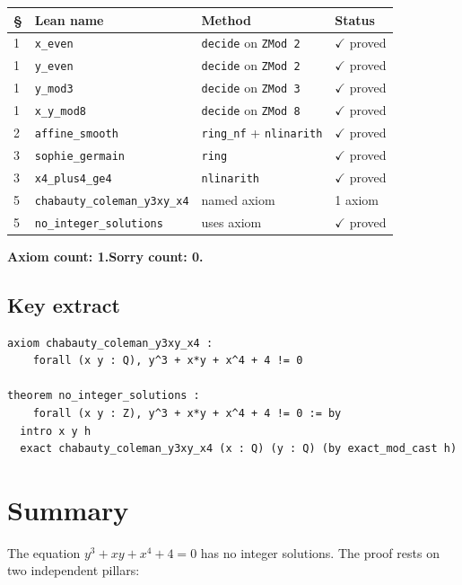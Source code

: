 \documentclass[12pt, a4paper]{article}
\theoremstyle{definition}
\begin{document}
\begin{center}
\begin{tabular}{llll}
\toprule
\S & Lean name & Method & Status \\
\midrule
1 & \texttt{x\_even} & \texttt{decide} on \texttt{ZMod 2} & $\checkmark$ proved \\
1 & \texttt{y\_even} & \texttt{decide} on \texttt{ZMod 2} & $\checkmark$ proved \\
1 & \texttt{y\_mod3} & \texttt{decide} on \texttt{ZMod 3} & $\checkmark$ proved \\
1 & \texttt{x\_y\_mod8} & \texttt{decide} on \texttt{ZMod 8} & $\checkmark$ proved \\
2 & \texttt{affine\_smooth} & \texttt{ring\_nf} + \texttt{nlinarith} & $\checkmark$ proved \\
3 & \texttt{sophie\_germain} & \texttt{ring} & $\checkmark$ proved \\
3 & \texttt{x4\_plus4\_ge4} & \texttt{nlinarith} & $\checkmark$ proved \\
5 & \texttt{chabauty\_coleman\_y3xy\_x4} & named axiom & 1 axiom \\
5 & \texttt{no\_integer\_solutions} & uses axiom & $\checkmark$ proved \\
\bottomrule
\end{tabular}
\end{center}

\medskip
\noindent\textbf{Axiom count: 1.}\quad \textbf{Sorry count: 0.}

\subsection*{Key extract}

\begin{lstlisting}[language=Lean4]
axiom chabauty_coleman_y3xy_x4 :
    forall (x y : Q), y^3 + x*y + x^4 + 4 != 0

theorem no_integer_solutions :
    forall (x y : Z), y^3 + x*y + x^4 + 4 != 0 := by
  intro x y h
  exact chabauty_coleman_y3xy_x4 (x : Q) (y : Q) (by exact_mod_cast h)
\end{lstlisting}

\section{Summary}

The equation $y^3 + xy + x^4 + 4 = 0$ has no integer solutions.  The proof rests on two independent pillars:
\end{document}
